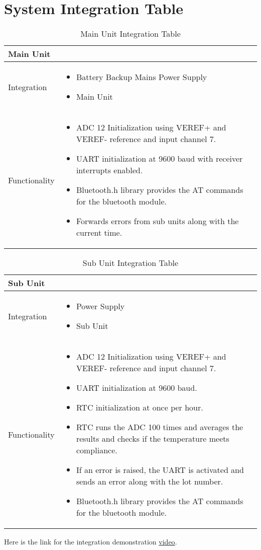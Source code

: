 \section{System Integration Table}
\begin{landscape}
\begin{table}[!ht]
\begin{tabularx}{1.2\textwidth}{|X|X|}
    \hline
    \multicolumn{2}{|X|}{Main Unit}\\
    \hline
    Integration&\begin{itemize}
        \item Battery Backup Mains Power Supply
        \item Main Unit
    \end{itemize}\\
    \hline
    Functionality&\begin{itemize}
        \item ADC 12 Initialization using VEREF+ and VEREF- reference and input channel 7.
        \item UART initialization at 9600 baud with receiver interrupts enabled.
        \item Bluetooth.h library provides the AT commands for the bluetooth module.
        \item Forwards errors from sub units along with the current time.
    \end{itemize}\\
    \hline
\end{tabularx}
\caption{Main Unit Integration Table}
\label{tab:main-unit-integration-table}
\end{table}
\begin{table}[!ht]
\begin{tabularx}{1.2\textwidth}{|X|X|}
    \hline
    \multicolumn{2}{|X|}{Sub Unit}\\
    \hline
    Integration&\begin{itemize}
        \item Power Supply
        \item Sub Unit
    \end{itemize}\\
    \hline
    Functionality&\begin{itemize}
        \item ADC 12 Initialization using VEREF+ and VEREF- reference and input channel 7.
        \item UART initialization at 9600 baud.
        \item RTC initialization at once per hour.
        \item RTC runs the ADC 100 times and averages the results and checks if the temperature meets compliance.
        \item If an error is raised, the UART is activated and sends an error along with the lot number.
        \item Bluetooth.h library provides the AT commands for the bluetooth module.
    \end{itemize}\\
    \hline
\end{tabularx}
\caption{Sub Unit Integration Table}
\label{tab:sub-unit-integration-table}
\end{table}
\end{landscape}
Here is the link for the integration demonstration \href{https://youtu.be/0NSB7EPtz0U}{video}.
